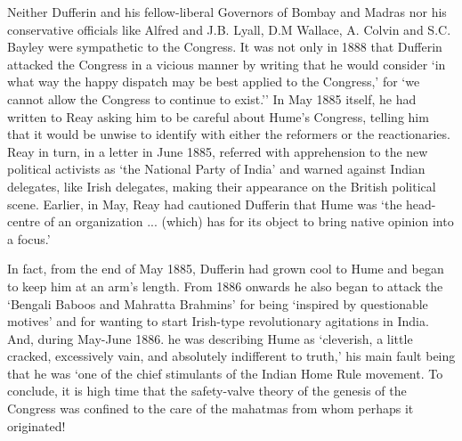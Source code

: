 \begin{multicols}{2}
Neither Dufferin and his fellow-liberal Governors of Bombay and Madras nor his conservative officials like Alfred and J.B. Lyall, D.M Wallace, A. Colvin and S.C. Bayley were sympathetic to the Congress. It was not only in 1888 that Dufferin attacked the Congress in a vicious manner by writing that he would consider `in what way the happy dispatch may be best applied to the Congress,' for `we cannot allow the Congress to continue to exist.'' In May 1885 itself, he had written to Reay asking him to be careful about Hume's Congress, telling him that it would be unwise to identify with either the reformers or the reactionaries. Reay in turn, in a letter in June 1885, referred with apprehension to the new political activists as `the National Party of India' and warned against Indian delegates, like Irish delegates, making their appearance on the British political scene. Earlier, in May, Reay had cautioned Dufferin that Hume was `the head-centre of an organization ... (which) has for its object to bring native opinion into a focus.'

In fact, from the end of May 1885, Dufferin had grown cool to Hume and began to keep him at an arm's length. From 1886 onwards he also began to attack the `Bengali Baboos and Mahratta Brahmins' for being `inspired by questionable motives' and for wanting to start Irish-type revolutionary agitations in India. And, during May-June 1886. he was describing Hume as `cleverish, a little cracked, excessively vain, and absolutely indifferent to truth,' his main fault being that he was `one of the chief stimulants of the Indian Home Rule movement. To conclude, it is high time that the safety-valve theory of the genesis of the Congress was confined to the care of the mahatmas from whom perhaps it originated!
\end{multicols}